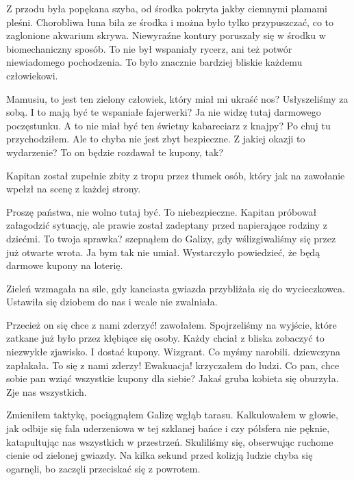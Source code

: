 Z przodu była popękana szyba, od środka pokryta jakby ciemnymi plamami pleśni.
Chorobliwa łuna biła ze środka i można było tylko przypuszczać, co to zaglonione akwarium skrywa.
Niewyraźne kontury poruszały się w środku w biomechaniczny sposób.
To nie był wspaniały rycerz, ani też potwór niewiadomego pochodzenia. 
To było znacznie bardziej bliskie każdemu człowiekowi.

\begin{dialogue}
	\ds{} Mamusiu, to jest ten zielony człowiek, który miał mi ukraść nos? \dm{} Usłyszeliśmy za sobą.
	\ds{} I to mają być te wspaniałe fajerwerki?
	\ds{} Ja nie widzę tutaj darmowego poczęstunku.
	\ds{} A to nie miał być ten świetny kabareciarz z knajpy?
	\ds{} Po chuj tu przychodziłem.
	\ds{} Ale to chyba nie jest zbyt bezpieczne.
	\ds{} Z jakiej okazji to wydarzenie?
	\ds{} To on będzie rozdawał te kupony, tak?
\end{dialogue}

Kapitan został zupełnie zbity z tropu przez tłumek osób, który jak na zawołanie wpełzł na scenę z każdej strony.

\begin{dialogue}
	\dm{} Proszę państwa, nie wolno tutaj być. To niebezpieczne. \dm{} Kapitan próbował załagodzić sytuację, ale prawie został zadeptany przed napierające rodziny z dziećmi.
	\ds{} To twoja sprawka? \dm{} szepnąłem do Galizy, gdy wślizgiwaliśmy się przez już otwarte wrota. \dm{} Ja bym tak nie umiał.
	\ds{} Wystarczyło powiedzieć, że będą darmowe kupony na loterię. 
\end{dialogue}

Zieleń wzmagała na sile, gdy kanciasta gwiazda przybliżała się do wycieczkowca.
Ustawiła się dziobem do nas i wcale nie zwalniała.

\begin{dialogue}
	\ds{} Przecież on się chce z nami zderzyć! \dm{} zawołałem. Spojrzeliśmy na wyjście, które zatkane już było przez kłębiące się osoby. Każdy chciał z bliska zobaczyć to niezwykłe zjawisko. I dostać kupony.
	\ds{} Wizgrant. Co myśmy narobili. \dm{} dziewczyna zapłakała.
	\ds{} To się z nami zderzy! Ewakuacja! \dm{} krzyczałem do ludzi.
	\ds{} Co pan, chce sobie pan wziąć wszystkie kupony dla siebie? \dm{} Jakaś gruba kobieta się oburzyła.
	\ds{} Zje nas wszystkich.
\end{dialogue}

Zmieniłem taktykę, pociągnąłem Galizę wgłąb tarasu.
Kalkulowałem w głowie, jak odbije się fala uderzeniowa w tej szklanej bańce i czy półsfera nie pęknie, katapultując nas wszystkich w przestrzeń.
Skuliliśmy się, obserwując ruchome cienie od zielonej gwiazdy.
Na kilka sekund przed kolizją ludzie chyba się ogarnęli, bo zaczęli przeciskać się z powrotem.

